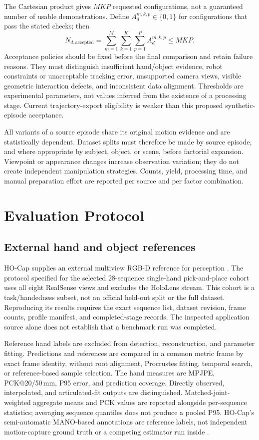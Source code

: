 The Cartesian product gives $M K P$ requested configurations, not a
guaranteed number of usable demonstrations. Define
$A_d^{m,k,p}\in\{0,1\}$ for configurations that pass the stated checks;
then
\begin{equation}
  N_{d,\mathrm{accepted}}
     =\sum_{m=1}^{M}\sum_{k=1}^{K}\sum_{p=1}^{P}A_d^{m,k,p}
     \leq M K P.
  \label{eq:accepted-expansion}
\end{equation}
Acceptance policies should be fixed before the final comparison and retain
failure reasons. They must distinguish insufficient hand/object evidence,
robot constraints or unacceptable tracking error, unsupported camera
views, visible geometric interaction defects, and inconsistent data
alignment. Thresholds are experimental parameters, not values inferred
from the existence of a processing stage. Current trajectory-export
eligibility is weaker than this proposed synthetic-episode acceptance.

All variants of a source episode share its original motion evidence and
are statistically dependent. Dataset splits must therefore be made by
source episode, and where appropriate by subject, object, or scene,
before factorial expansion. Viewpoint or appearance changes increase
observation variation; they do not create independent manipulation
strategies. Counts, yield, processing time, and manual preparation effort
are reported per source and per factor combination.

\section{Evaluation Protocol}
\label{sec:hocap-method}

\subsection{External hand and object references}

HO-Cap supplies an external multiview RGB-D reference for perception
\cite{hocap}. The protocol specified for the selected 28-sequence
single-hand pick-and-place cohort uses all eight RealSense views and
excludes the HoloLens stream. This cohort is a task/handedness subset,
not an official held-out split or the full dataset. Reproducing its
results requires the exact sequence list, dataset revision, frame counts,
profile manifest, and completed-stage records. The inspected application
source alone does not establish that a benchmark run was completed.

Reference hand labels are excluded from detection, reconstruction, and
parameter fitting. Predictions and references are compared in a common
metric frame by exact frame identity, without root alignment,
Procrustes fitting, temporal search, or reference-based sample selection.
The hand measures are MPJPE, PCK@20/50\,mm, P95 error, and prediction
coverage. Directly observed, interpolated, and articulated-fit outputs
are distinguished. Matched-joint-weighted aggregate means and PCK values
are reported alongside per-sequence statistics; averaging sequence
quantiles does not produce a pooled P95. HO-Cap's semi-automatic
MANO-based annotations are reference labels, not independent motion-capture
ground truth or a competing estimator run inside \viki.

